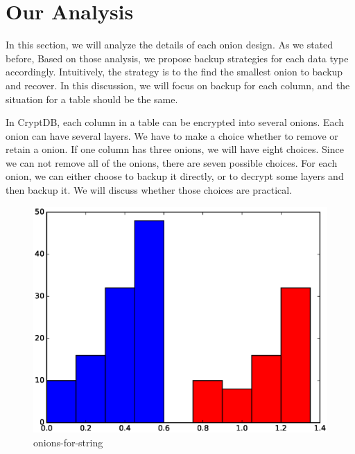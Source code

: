 \section{Our Analysis}


In this section, we will analyze the details of each onion design. As we stated before, Based on those analysis, we propose backup strategies for each data type accordingly. Intuitively, the strategy is to the find the smallest onion to backup and recover. In this discussion, we will focus on backup for each column, and the situation for a table should be the same. 

In CryptDB, each column in a table can be encrypted into several onions. Each onion can have several layers. We have to make a choice whether to remove or retain a onion. If one column has three onions, we will have eight choices. Since we can not remove all of the onions, there are seven possible choices. For each onion, we can either choose to backup it directly, or to decrypt some layers and then backup it. We will discuss whether those choices are practical.

\begin{figure}[tb]
\centering
\includegraphics[width=\columnwidth]{images/onions-for-string.eps}
\caption{onions-for-string}
\label{fig:stack4}
\end{figure}


